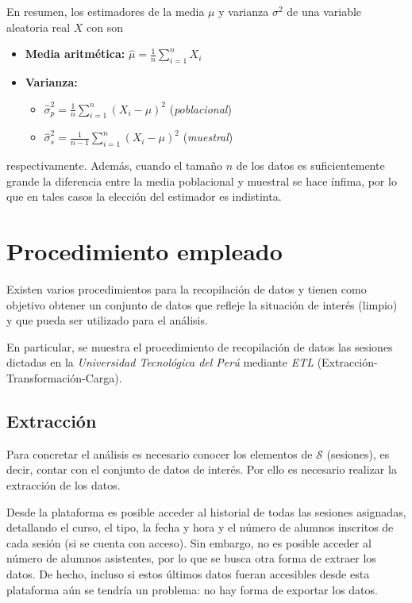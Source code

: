 \documentclass[11pt,a4paper]{book}
\theoremstyle{definition}%
\begin{document}
            En resumen, los estimadores de la media $\mu$ y varianza $\sigma^2$ de una variable aleatoria real $X$ con son
            \begin{itemize}
                \item \textbf{Media aritmética:} $\hat{\mu}=\frac{1}{n}\sum_{i=1}^n X_i$
                 \item \textbf{Varianza:}
                 \begin{itemize}
                     \item $\hat{\sigma}_p^2=\frac{1}{n}\sum_{i=1}^n (X_i-\mu)^2$ (\textit{poblacional})
                     \item $\hat{\sigma}_s^2=\frac{1}{n-1}\sum_{i=1}^n (X_i-\mu)^2$ (\textit{muestral})
                 \end{itemize}
            \end{itemize}
            respectivamente. Además, cuando el tamaño $n$ de los datos es suficientemente grande la diferencia entre la media poblacional y muestral se hace ínfima, por lo que en tales casos la elección del estimador es indistinta.
        
        \chapter{Procedimiento empleado}
            Existen varios procedimientos para la recopilación de datos y tienen como objetivo obtener un conjunto de datos que refleje la situación de interés (limpio) y que pueda ser utilizado para el análisis.
            
            En particular, se muestra el procedimiento de recopilación de datos las sesiones dictadas en la \textit{Universidad Tecnológica del Perú} mediante  \textit{ETL} (Extracción-Transformación-Carga).
            \section{Extracción}
                Para concretar el análisis es necesario conocer los elementos de $\mathcal{S}$ (sesiones), es decir, contar con el conjunto de datos de interés. Por ello es necesario realizar la extracción de los datos.
                
                Desde la plataforma \cite{utp:reservas} es posible acceder al historial de todas las sesiones asignadas, detallando el curso, el tipo, la  fecha y hora y el número de alumnos inscritos de cada sesión (si se cuenta con acceso). Sin embargo, no es posible acceder al número de alumnos asistentes, por lo que se busca otra forma de extraer los datos. De hecho, incluso si estos últimos datos fueran accesibles desde esta plataforma aún se tendría un problema: no hay forma de exportar los datos.
    
\end{document}
